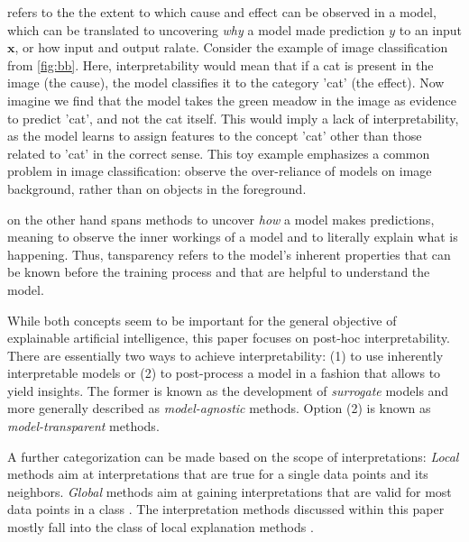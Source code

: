  refers to the the extent to which cause and effect can be observed in a model, which can be translated to uncovering \textit{why} a model made prediction $y$ to an input $\mathbf{x}$, or how input and output ralate. Consider the example of image classification from \autoref{fig:bb}. Here, interpretability would mean that if a cat is present in the image (the cause), the model classifies it to the category 'cat' (the effect). Now imagine we find that the model takes the green meadow in the image as evidence to predict 'cat', and not the cat itself. This would imply a lack of interpretability, as the model learns to assign features to the concept 'cat' other than those related to 'cat' in the correct sense. This toy example emphasizes a common problem in image classification: \cite{xiao2020noise} observe the over-reliance of models on image background, rather than on objects in the foreground. %

 on the other hand spans methods to uncover \textit{how} a model makes predictions, meaning to observe the inner workings of a model and to literally explain what is happening. Thus, tansparency refers to the model's inherent properties that can be known before the training process and that are helpful to understand the model.

\par\smallskip
While both concepts seem to be important for the general objective of explainable artificial intelligence, this paper focuses on post-hoc interpretability.
There are essentially two ways to achieve interpretability: (1) to use inherently interpretable models or (2) to post-process a model in a fashion that allows to yield insights. The former is known as the development of \textit{surrogate} models and more generally described as \textit{model-agnostic} methods. Option (2) is known as \textit{model-transparent} methods. 

A further categorization can be made based on the scope of interpretations: \textit{Local} methods aim at interpretations that are true for a single data points and its neighbors. 
\textit{Global} methods aim at gaining interpretations that are valid for most data points in a class \cite{kim2018interpretability, nguyen2017plug, yosinski2015understanding}. The interpretation methods discussed within this paper mostly fall into the class of local explanation methods \cite{ribeiro2016should, lundberg2017unified, bach2015pixel}. %

